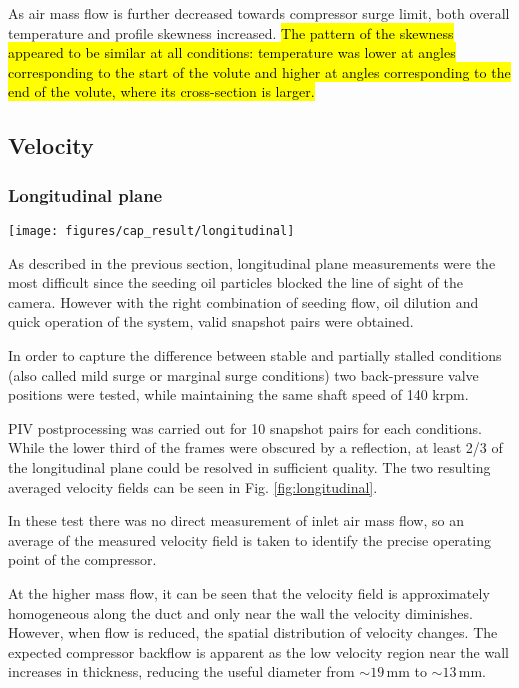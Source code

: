 As air mass flow is further decreased towards compressor surge limit, both overall temperature and profile skewness increased. \hl{The pattern of the skewness appeared to be similar at all conditions: temperature was lower at angles corresponding to the start of the volute and higher at angles corresponding to the end of the volute, where its cross-section is larger.}

\subsection{Velocity}
\label{sub:velocity}

\subsubsection{Longitudinal plane}

\begin{figure*}[htb!]
\centering
\texttt{[image: figures/cap\_result/longitudinal]}
\caption{Results of the axial velocity field measurement (longitudinal plane) for the two operating points considered: low}
\label{fig:longitudinal}
\end{figure*}

As described in the previous section, longitudinal plane measurements were the most difficult since the seeding oil particles blocked the line of sight of the camera. However with the right combination of seeding flow, oil dilution and quick operation of the system, valid snapshot pairs were obtained.

In order to capture the difference between stable and partially stalled conditions (also called mild surge or marginal surge conditions) two back-pressure valve positions were tested, while maintaining the same shaft speed of 140 krpm.

PIV postprocessing was carried out for 10 snapshot pairs for each conditions. While the lower third of the frames were obscured by a reflection, at least 2/3 of the longitudinal plane could be resolved in sufficient quality. The two resulting averaged velocity fields can be seen in Fig. \ref{fig:longitudinal}.

In these test there was no direct measurement of inlet air mass flow, so an average of the measured velocity field is taken to identify the precise operating point of the compressor.

At the higher mass flow, it can be seen that the velocity field is approximately homogeneous along the duct and only near the wall the velocity diminishes. However, when flow is reduced, the spatial distribution of velocity changes. The expected compressor backflow is apparent as the low velocity region near the wall increases in thickness, reducing the useful diameter from $\sim 19\,$mm to $\sim 13\,$mm.

